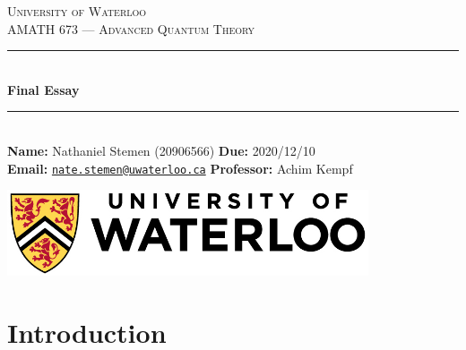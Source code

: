 \documentclass[11pt]{article}
\begin{document}
\begin{titlepage}
	\newcommand{\HRule}{\rule{\linewidth}{0.5mm}}

	\begin{center}

		\textsc{\LARGE University of Waterloo}\\[1.5cm]

		\textsc{\large AMATH 673 --- Advanced Quantum Theory}\\[0.75cm]

		\HRule\\[0.4cm]

		{\huge\bfseries Final Essay}\\[0.15cm]

		\HRule\\[1cm]

		{\large
		\textbf{Name:} Nathaniel Stemen (20906566)\hspace{\fill} \textbf{Due:} 2020/12/10 \\
		\textbf{Email:} \href{mailto:nate.stemen@uwaterloo.ca}{\texttt{nate.stemen@uwaterloo.ca}} \hspace{\fill} \textbf{Professor:} Achim Kempf
		}

		\vfill
		\includegraphics[width=0.8\textwidth]{uwlogo.jpg}\\[1cm]
	\end{center}
\end{titlepage}


\tableofcontents

\section{Introduction}


\clearpage


\end{document}
